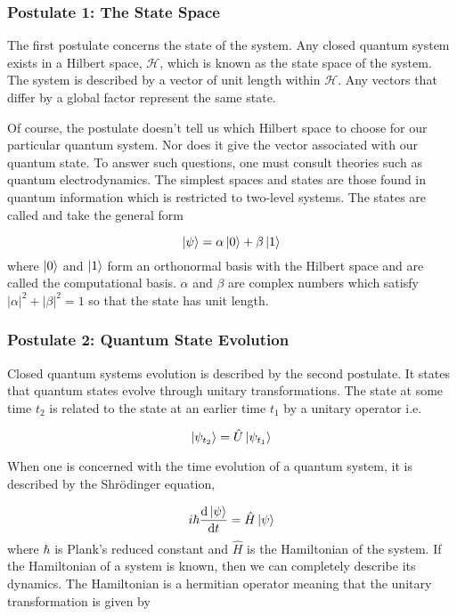 \subsubsection*{Postulate 1: The State Space}

The first postulate concerns the state of the system. Any closed quantum system exists in a Hilbert space, $\mathcal{H}$, which is known as the state space of the system. The system is described by a vector of unit length within $\mathcal{H}$. Any vectors that differ by a global factor represent the same state.

Of course, the postulate doesn't tell us which Hilbert space to choose for our particular quantum system. Nor does it give the vector associated with our quantum state. To answer such questions, one must consult theories such as quantum electrodynamics. The simplest spaces and states are those found in quantum information which is restricted to two-level systems. The states are called  and take the general form

\begin{equation}
	\ket{\psi} = \alpha\ket{0} + \beta\ket{1}
\end{equation} 
where $\ket{0}$ and $\ket{1}$ form an orthonormal basis with the Hilbert space and are called the computational basis. $\alpha$ and $\beta$ are complex numbers which satisfy $|\alpha|^2 + |\beta|^2 = 1$ so that the state has unit length.

\subsubsection*{Postulate 2: Quantum State Evolution}

Closed quantum systems evolution is described by the second postulate. It states that quantum states evolve through unitary transformations. The state at some time $t_2$ is related to the state at an earlier time $t_1$ by a unitary operator i.e.

\begin{equation}
	\ket{\psi_{t_2}} = \hat{U}\ket{\psi_{t_1}}
\end{equation}

When one is concerned with the time evolution of a quantum system, it is described by the Shr\"{o}dinger equation,

\begin{equation}
	i \hbar \frac{\mathrm{d}\ket{\psi}}{\mathrm{d}t} = \hat{H}\ket{\psi}
\end{equation}
where $\hbar$ is Plank's reduced constant and $\hat{H}$ is the Hamiltonian of the system. If the Hamiltonian of a system is known, then we can completely describe its dynamics. The Hamiltonian is a hermitian operator meaning that the unitary transformation is given by

